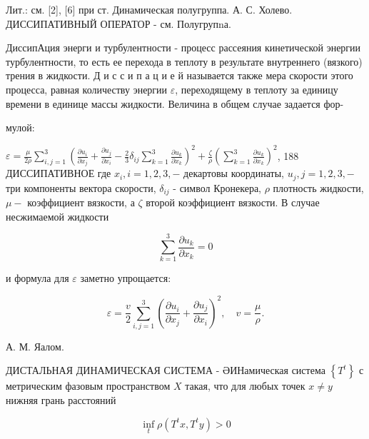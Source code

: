 \documentclass[10pt]{article}
\begin{document}
Лит.: см. [2], [6] при ст. Динамическая полугруппа. А. С. Холево. ДИССИПАТИВНЫЙ ОПЕРАТОР - см. Полугрупnа.



ДиссипАция энерги и турбулентности - процесс рассеяния кинетической энергии турбулентности, то есть ее перехода в теплоту в результате внутреннего (вязкого) трения в жидкости. Д и с с и п а ц и е й называется также мера скорости этого процесса, равная количеству энергии $\varepsilon$, переходящему в теплоту за единицу времени в единице массы жидкости. Величина в общем случае задается фор-



мулой:

$\varepsilon=\frac{\mu}{2 \rho} \sum_{i, j=1}^{3}\left(\frac{\partial u_{i}}{\partial x_{j}}+\frac{\partial u_{j}}{\partial x_{i}}-\frac{2}{3} \delta_{i j} \sum_{k=1}^{3} \frac{\partial u_{k}}{\partial x_{k}}\right)^{2}+\frac{\zeta}{\rho}\left(\sum_{k=1}^{3} \frac{\partial u_{k}}{\partial x_{k}}\right)^{2}$, 188 ДИССИПАТИВНОЕ где $x_{i}, i=1,2,3,-$ декартовы координаты, $u_{j}, j=1,2,3,-$ три компоненты вектора скорости, $\delta_{i j}$ - символ Кронекера, $\rho$ плотность жидкости, $\mu-$ коэффициент вязкости, а $\zeta$ второй коэффициент вязкости. В случае несжимаемой жидкости



\[

\sum_{k=1}^{3} \frac{\partial u_{k}}{\partial x_{k}}=0

\]



и формула для $\varepsilon$ заметно упрощается:



\[

\varepsilon=\frac{v}{2} \sum_{i, j=1}^{3}\left(\frac{\partial u_{i}}{\partial x_{j}}+\frac{\partial u_{j}}{\partial x_{i}}\right)^{2}, \quad v=\frac{\mu}{\rho} .

\]



А. М. Яалом.



ДИСТАЛЬНАЯ ДИНАМИЧЕСКАЯ СИСТЕМА - ӘИНамическая система $\left\{T^{t}\right\}$ с метрическим фазовым пространством $X$ такая, что для любых точек $x \neq y$ нижняя грань расстояний



\[

\inf _{t} \rho\left(T^{t} x, T^{t} y\right)>0

\]
\end{document}

